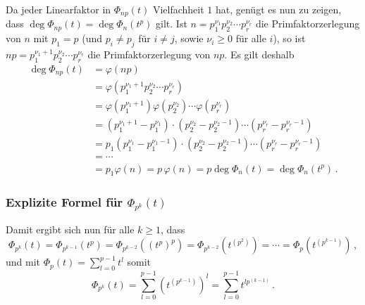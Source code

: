 Da jeder Linearfaktor in $\Phi_{np}(t)$ Vielfachheit $1$ hat, genügt es nun zu zeigen, dass $\deg \Phi_{np}(t) = \deg \Phi_n(t^p)$ gilt.
Ist $n = p_1^{\nu_1} p_2^{\nu_2} \dotsm p_r^{\nu_r}$ die Primfaktorzerlegung von $n$ mit $p_1 = p$ (und $p_i \neq p_j$ für $i \neq j$, sowie $\nu_i \geq 0$ für alle $i$), so ist $np = p_1^{\nu_1 + 1} p_2^{\nu_2} \dotsm p_r^{\nu_r}$ die Primfaktorzerlegung von $np$.
Es gilt deshalb
\begin{align*}
      \deg \Phi_{np}(t)
  &=  \varphi(np)
  \\
  &=  \varphi( p_1^{\nu_1 + 1} p_2^{\nu_2} \dotsm p_r^{\nu_r} )
  \\
  &=  \varphi( p_1^{\nu_1 + 1} ) \varphi( p_2^{\nu_2} ) \dotsm \varphi( p_r^{\nu_r} )
  \\
  &=  (p_1^{\nu_1 + 1} - p_1^{\nu_1}) \cdot ( p_2^{\nu_2} - p_2^{\nu_2 - 1} ) \dotsm ( p_r^{\nu_r} - p_r^{\nu_r - 1})
  \\
  &= p_1 (p_1^{\nu_1} - p_1^{\nu_1 - 1}) \cdot ( p_2^{\nu_2} - p_2^{\nu_2 - 1} ) \dotsm ( p_r^{\nu_r} - p_r^{\nu_r - 1})
  \\
  &= \dotsb
  \\
  &= p_1 \varphi(n)
   = p \, \varphi(n)
   = p \deg \Phi_n(t)
   = \deg \Phi_n(t^p)\,.
\end{align*}





\subsubsection*{Explizite Formel für $\Phi_{p^k}(t)$}

Damit ergibt sich nun für alle $k \geq 1$, dass
\[
    \Phi_{p^k}(t)
  = \Phi_{p^{k-1}}(t^p)
  = \Phi_{p^{k-2}}((t^p)^p)
  = \Phi_{p^{k-2}}\left( t^{(p^2)} \right)
  = \dotsb
  = \Phi_p\left( t^{(p^{k-1})} \right)\,,
\]
und mit $\Phi_p(t) = \sum_{l=0}^{p-1} t^l$ somit
\[
    \Phi_{p^k}(t)
  = \sum_{l=0}^{p-1} \left( t^{(p^{k-1})} \right)^l
  = \sum_{l=0}^{p-1} t^{l p^{(k-1)}}\,.
\]













































